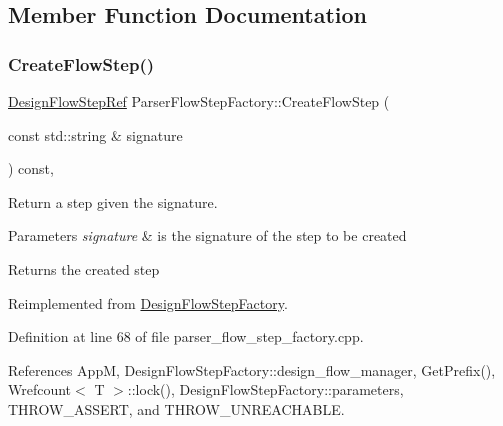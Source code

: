 \subsection{Member Function Documentation}
\mbox{\label{classParserFlowStepFactory_a694b513efdd4a039212c4ce072ceb8f4}} 
\subsubsection{\texorpdfstring{Create\+Flow\+Step()}{CreateFlowStep()}}
{\footnotesize\ttfamily \hyperlink{design__flow__step_8hpp_a9dd6b4474ddf52d41a78b1aaa12ae6c8}{Design\+Flow\+Step\+Ref} Parser\+Flow\+Step\+Factory\+::\+Create\+Flow\+Step (\begin{DoxyParamCaption}\item[{const std\+::string \&}]{signature }\end{DoxyParamCaption}) const\hspace{0.3cm}{\ttfamily [override]}, {\ttfamily [virtual]}}



Return a step given the signature. 


\begin{DoxyParams}{Parameters}
{\em signature} & is the signature of the step to be created \\
\hline
\end{DoxyParams}
\begin{DoxyReturn}{Returns}
the created step 
\end{DoxyReturn}


Reimplemented from \hyperlink{classDesignFlowStepFactory_af65c5bc8971c3ae43e0f4b6fa183c1af}{Design\+Flow\+Step\+Factory}.



Definition at line 68 of file parser\+\_\+flow\+\_\+step\+\_\+factory.\+cpp.



References AppM, Design\+Flow\+Step\+Factory\+::design\+\_\+flow\+\_\+manager, Get\+Prefix(), Wrefcount$<$ T $>$\+::lock(), Design\+Flow\+Step\+Factory\+::parameters, T\+H\+R\+O\+W\+\_\+\+A\+S\+S\+E\+RT, and T\+H\+R\+O\+W\+\_\+\+U\+N\+R\+E\+A\+C\+H\+A\+B\+LE.

